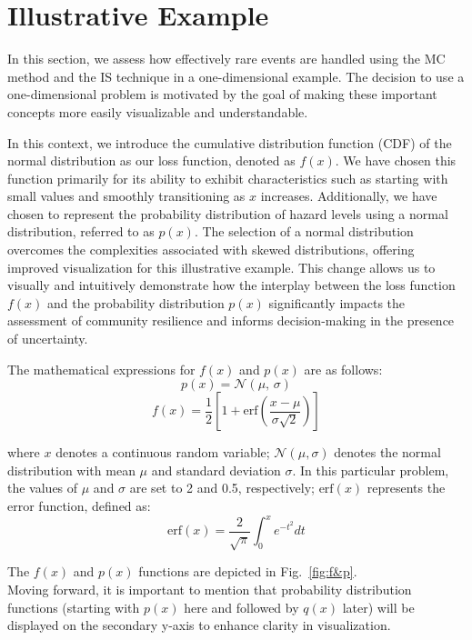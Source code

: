 \section{Illustrative Example}
    In this section, we assess how effectively rare events are handled using the MC method and the IS technique in a one-dimensional example. The decision to use a one-dimensional problem is motivated by the goal of making these important concepts more easily visualizable and understandable.

    In this context, we introduce the cumulative distribution function (CDF) of the normal distribution as our loss function, denoted as $f(x)$. We have chosen this function primarily for its ability to exhibit characteristics such as starting with small values and smoothly transitioning as $x$ increases. Additionally, we have chosen to represent the probability distribution of hazard levels using a normal distribution, referred to as $p(x)$. The selection of a normal distribution overcomes the complexities associated with skewed distributions, offering improved visualization for this illustrative example. This change allows us to visually and intuitively demonstrate how the interplay between the loss function $f(x)$ and the probability distribution $p(x)$ significantly impacts the assessment of community resilience and informs decision-making in the presence of uncertainty.

    The mathematical expressions for $f(x)$ and $p(x)$ are as follows:
    $$p(x)=\mathcal{N}(\mu,\,\sigma)$$
    $$f(x) = \frac{1}{2}[1 + \text{erf}(\frac{x - \mu}{\sigma\sqrt{2}})]$$
    
    where $x$ denotes a continuous random variable; $\mathcal{N}(\mu, \sigma)$ denotes the normal distribution with mean $\mu$ and standard deviation $\sigma$. In this particular problem, the values of $\mu$ and $\sigma$ are set to 2 and 0.5, respectively; $\text{erf}(x)$ represents the error function, defined as:
    $$\text{erf}(x) = \frac{2}{\sqrt{\pi}} \int_0^x e^{-t^2} dt$$
        
    The $f(x)$ and $p(x)$ functions are depicted in Fig.~\ref{fig:f&p}. \\
    Moving forward, it is important to mention that probability distribution functions (starting with $p(x)$ here and followed by $q(x)$ later) will be displayed on the secondary y-axis to enhance clarity in visualization.
   
    

